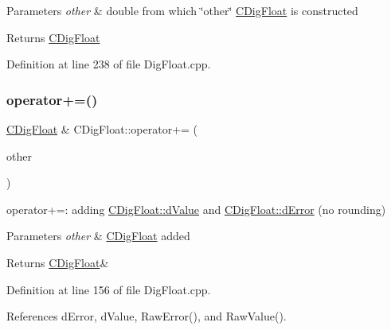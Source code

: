\begin{DoxyParams}{Parameters}
{\em other} & double from which \char`\"{}other\char`\"{} \hyperlink{classCDigFloat}{C\+Dig\+Float} is constructed \\
\hline
\end{DoxyParams}
\begin{DoxyReturn}{Returns}
\hyperlink{classCDigFloat}{C\+Dig\+Float} 
\end{DoxyReturn}


Definition at line 238 of file Dig\+Float.\+cpp.

\mbox{\label{classCDigFloat_a84b2ad9b4d1a75aae261074ed7c6fefe}} 
\subsubsection{\texorpdfstring{operator+=()}{operator+=()}\hspace{0.1cm}{\footnotesize\ttfamily [1/2]}}
{\footnotesize\ttfamily \hyperlink{classCDigFloat}{C\+Dig\+Float} \& C\+Dig\+Float\+::operator+= (\begin{DoxyParamCaption}\item[{const \hyperlink{classCDigFloat}{C\+Dig\+Float} \&}]{other }\end{DoxyParamCaption})}



operator+=\+: adding \hyperlink{classCDigFloat_a4bbe69e30dd4e20527362493aa9aaf96}{C\+Dig\+Float\+::d\+Value} and \hyperlink{classCDigFloat_a25eb3782d1e727ff007a48f8308e3d4d}{C\+Dig\+Float\+::d\+Error} (no rounding) 


\begin{DoxyParams}{Parameters}
{\em other} & \hyperlink{classCDigFloat}{C\+Dig\+Float} added \\
\hline
\end{DoxyParams}
\begin{DoxyReturn}{Returns}
\hyperlink{classCDigFloat}{C\+Dig\+Float}\& 
\end{DoxyReturn}


Definition at line 156 of file Dig\+Float.\+cpp.



References d\+Error, d\+Value, Raw\+Error(), and Raw\+Value().

\mbox{\label{classCDigFloat_a9fdc59da135bf2a165f28fa95258beb9}} 
